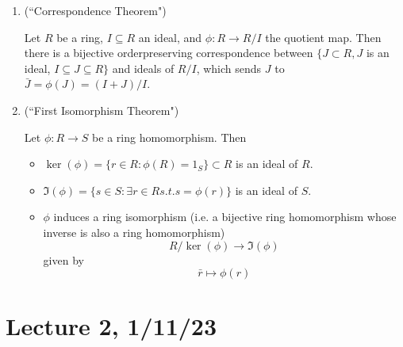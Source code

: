 \documentclass[x11names,reqno,14pt]{extarticle}
\begin{document}
\begin{enumerate}
\item (``Correspondence Theorem")

Let $R$ be a ring, $I\subseteq R$ an ideal, and $\phi:R\to R/I$ the quotient map. Then there is a bijective orderpreserving correspondence between $\{J \subset R, J$ is an ideal, $I \subseteq J \subseteq R\}$ and ideals of $R/I$, which sends $J$ to $\bar{J} = \phi(J) = (I + J)/I$. 

\item (``First Isomorphism Theorem")

Let $\phi:R\to S$ be a ring homomorphism. Then 
\begin{itemize}
\item $\ker(\phi) = \{r\in R: \phi(R) = 1_S\}\subset R$ is an ideal of $R$.
\item $\Im(\phi) = \{s \in S: \exists r \in R s.t. s = \phi(r)\}$ is an ideal of $S$.
\item $\phi$ induces a ring isomorphism (i.e. a bijective ring homomorphism whose inverse is also a ring homomorphism) 
\[
R/\ker(\phi) \to \Im(\phi)
\]
given by
\[
\bar{r}\mapsto\phi(r)
\]

\end{itemize}

\end{enumerate}

\section*{Lecture 2, 1/11/23} 
\end{document}
